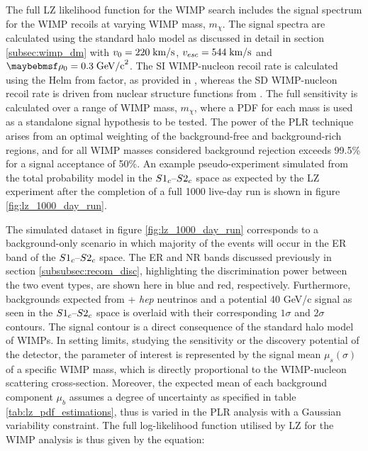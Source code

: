The full LZ likelihood function for the WIMP search includes the signal spectrum for the WIMP recoils at varying WIMP mass, $m_{\chi}$. The signal spectra are calculated using the standard halo model as discussed in detail in section \ref{subsec:wimp_dm} with $v_{0} = 220 \; \text{km/s}$, $v_{esc} = 544 \; \text{km/s}$ and $\rho_{0} = 0.3 \; \MathText{GeV/c}^2$. The SI WIMP-nucleon recoil rate is calculated using the Helm from factor, as provided in \cite{PhysRev.104.1466}, whereas the SD WIMP-nucleon recoil rate is driven from nuclear structure functions from \cite{PhysRevD.88.083516}. The full sensitivity is calculated over a range of WIMP mass, $m_{\chi}$, where a PDF for each mass is used as a standalone signal hypothesis to be tested. The power of the PLR technique arises from an optimal weighting of the background-free and background-rich regions, and for all WIMP masses considered background rejection exceeds 99.5\% for a signal acceptance of 50\%. An example pseudo-experiment simulated from the total probability model in the $S1_{c}\text{--}{}S2_{c}$ space as expected by the LZ experiment after the completion of a full 1000 live-day run is shown in figure \ref{fig:lz_1000_day_run}. 

The simulated dataset in figure \ref{fig:lz_1000_day_run} corresponds to a background-only scenario in which majority of the events will occur in the ER band of the $S1_{c}\text{--}{}S2_{c}$ space. The ER and NR bands discussed previously in section \ref{subsubsec:recom_disc}, highlighting the discrimination power between the two event types, are shown here in blue and red, respectively. Furthermore, backgrounds expected from \BE{} + \textit{hep} neutrinos and a potential 40 GeV/c\squared{} signal as seen in the $S1_{c}\text{--}{}S2_{c}$ space is overlaid with their corresponding $1\sigma$ and $2\sigma$ contours. The signal contour is a direct consequence of the standard halo model of WIMPs. In setting limits, studying the sensitivity or the discovery potential of the detector, the parameter of interest is represented by the signal mean $\mu_{s}(\sigma)$ of a specific WIMP mass, which is directly proportional to the WIMP-nucleon scattering cross-section. Moreover, the expected mean of each background component $\mu_{b}$ assumes a degree of uncertainty as specified in table \ref{tab:lz_pdf_estimations}, thus is varied in the PLR analysis with a Gaussian variability constraint. The full log-likelihood function utilised by LZ for the WIMP analysis is thus given by the equation:


